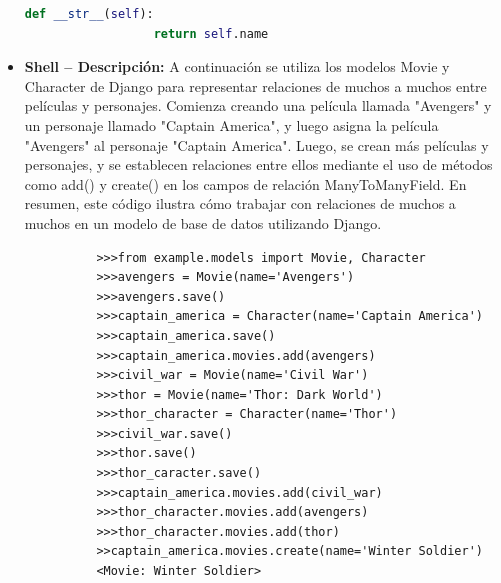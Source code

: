 \documentclass{article}
\begin{document}
\begin{itemize}
\begin{lstlisting}[language=Python]
              def __str__(self):
                  return self.name
        \end{lstlisting}
      \item \textbf{Shell -- Descripción: }A continuación se utiliza los modelos Movie y Character de Django 
        para representar relaciones de muchos a muchos entre películas y personajes. Comienza creando una película 
        llamada "Avengers" y un personaje llamado "Captain America", y luego asigna la película "Avengers" al personaje 
        "Captain America". Luego, se crean más películas y personajes, y se establecen relaciones entre ellos mediante 
        el uso de métodos como add() y create() en los campos de relación ManyToManyField. En resumen, este código 
        ilustra cómo trabajar con relaciones de muchos a muchos en un modelo de base de datos utilizando Django.
        \newline
        \begin{lstlisting}
          >>>from example.models import Movie, Character
          >>>avengers = Movie(name='Avengers')
          >>>avengers.save()
          >>>captain_america = Character(name='Captain America')
          >>>captain_america.save()
          >>>captain_america.movies.add(avengers)
          >>>civil_war = Movie(name='Civil War')
          >>>thor = Movie(name='Thor: Dark World')
          >>>thor_character = Character(name='Thor')
          >>>civil_war.save()
          >>>thor.save()
          >>>thor_caracter.save()
          >>>captain_america.movies.add(civil_war)
          >>>thor_character.movies.add(avengers)
          >>>thor_character.movies.add(thor)
          >>captain_america.movies.create(name='Winter Soldier')
          <Movie: Winter Soldier>
        \end{lstlisting}
    \end{itemize}
  
\end{document}
